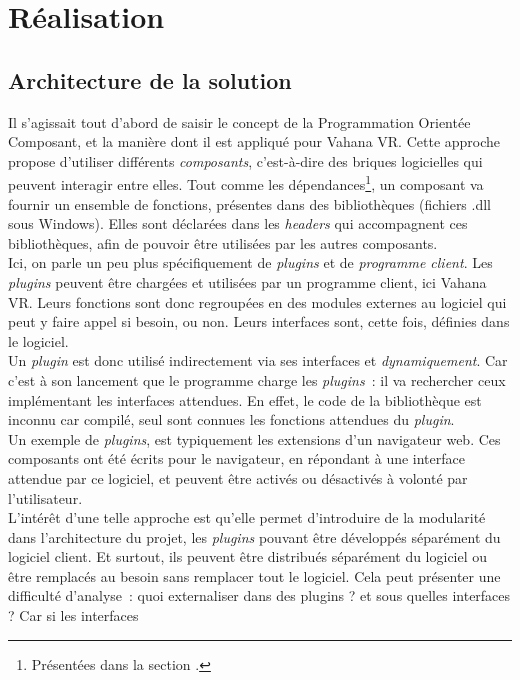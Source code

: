 \section{Réalisation}
\subsection{Architecture de la solution}
Il s'agissait tout d'abord de saisir le concept de la Programmation Orientée Composant, et la manière
dont il est appliqué pour Vahana VR.
Cette approche propose d'utiliser différents \emph{composants}, c'est-à-dire des briques logicielles
qui peuvent interagir entre elles. Tout comme les dépendances\footnote{Présentées dans 
la section .}, un composant va fournir un ensemble
de fonctions, présentes dans des bibliothèques (fichiers .dll sous Windows). Elles sont
déclarées dans les \textit{headers} qui accompagnent ces bibliothèques, afin de 
pouvoir être utilisées par les autres composants.\cite{poc}\\
Ici, on parle un peu plus spécifiquement de \textit{plugins} et de \emph{programme client}.
Les \textit{plugins} peuvent être chargées et utilisées par un programme client, 
ici Vahana VR. Leurs fonctions sont donc regroupées en des modules externes
au logiciel qui peut y faire appel si besoin, ou non. Leurs interfaces sont, cette
fois, définies dans le logiciel.\cite{plugin}\\
Un \textit{plugin} est donc utilisé indirectement via ses interfaces et \emph{dynamiquement}.
Car c'est à son lancement que le programme charge les \textit{plugins}~:
il va rechercher ceux implémentant les interfaces attendues. En effet,
le code de la bibliothèque est inconnu car compilé, seul sont connues les fonctions 
attendues du \textit{plugin}.\\
\newline
Un exemple de \textit{plugins}, est typiquement les extensions d'un navigateur web. Ces composants
ont été écrits pour le navigateur, en répondant à une interface attendue par ce logiciel,
et peuvent être activés ou désactivés à volonté par l'utilisateur.\\
L'intérêt d'une telle approche est qu'elle permet d'introduire de la modularité dans 
l'architecture du projet, les \textit{plugins} pouvant être développés séparément du logiciel
client. Et surtout, ils peuvent être distribués séparément du logiciel ou être remplacés
au besoin sans remplacer tout le logiciel. Cela peut présenter une difficulté d'analyse~:
quoi externaliser dans des plugins ? et sous quelles interfaces ? Car si les interfaces

